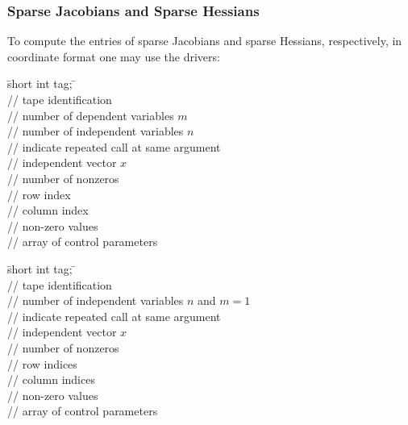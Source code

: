 \documentclass[11pt,twoside]{article}
\begin{document}
\subsubsection*{Sparse Jacobians and Sparse Hessians}
%
To compute the entries of sparse Jacobians and sparse Hessians,
respectively, in coordinate format one may use the drivers:
\begin{tabbing}
\hspace{0.5in}\={\sf short int tag;} \hspace{1.1in}\= \kill    %
\\
         \> // tape identification \\
                 \> // number of dependent variables $m$\\ 
                 \> // number of independent variables $n$\\
            \> // indicate repeated call at same argument\\
           \> // independent vector $x$ \\
               \> // number of nonzeros \\ 
\> // row index\\  
\> // column index\\ 
    \> // non-zero values\\  
        \> // array of control parameters\\  
\end{tabbing}
%
\begin{tabbing}
\hspace{0.5in}\={\sf short int tag;} \hspace{1.1in}\= \kill    %
\\
         \> // tape identification \\
                 \> // number of independent variables $n$ and $m=1$\\
            \> // indicate repeated call at same argument\\
           \> // independent vector $x$ \\
               \> // number of nonzeros \\ 
\> // row indices\\  
\> // column indices\\ 
    \> // non-zero values  \\
        \> // array of control parameters\\  
\end{tabbing}
\end{document}
